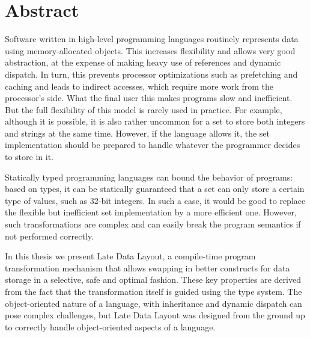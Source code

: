 

\cleardoublepage
\chapter*{Abstract}

\vspace{1em}

Software written in high-level programming languages routinely represents data using memory-allocated objects. This increases flexibility and allows very good abstraction, at the expense of making heavy use of references and dynamic dispatch. In turn, this prevents processor optimizations such as prefetching and caching and leads to indirect accesses, which require more work from the processor's side. What the final user this makes programs slow and inefficient. But the full flexibility of this model is rarely used in practice. For example, although it is possible, it is also rather uncommon for a set to store both integers and strings at the same time. However, if the language allows it, the set implementation should be prepared to handle whatever the programmer decides to store in it.

\vspace{1em}

Statically typed programming languages can bound the behavior of programs: based on types, it can be statically guaranteed that a set can only store a certain type of values, such as 32-bit integers. In such a case, it would be good to replace the flexible but inefficient set implementation by a more efficient one. However, such transformations are complex and can easily break the program semantics if not performed correctly.

\vspace{1em}

In this thesis we present Late Data Layout, a compile-time program transformation mechanism that allows swapping in better constructs for data storage in a selective, safe and optimal fashion. These key properties are derived from the fact that the transformation itself is guided using the type system. The object-oriented nature of a language, with inheritance and dynamic dispatch can pose complex challenges, but Late Data Layout was designed from the ground up to correctly handle object-oriented aspects of a language.


